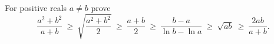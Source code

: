 For positive reals $a\ne b$ prove
\[\dfrac{a^2+b^2}{a+b}\ \ge\ \sqrt{\dfrac{a^2+b^2}{2}}\ \ge\ \dfrac{a+b}{2}\ \ge\ \dfrac{b-a}{\ln b-\ln a}\ \ge\ \sqrt{ab}\ \ge\ \dfrac{2ab}{a+b}.\]
